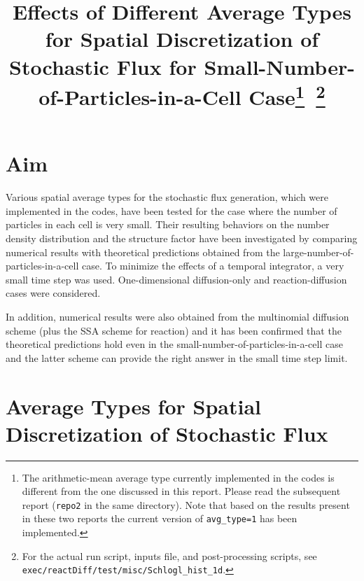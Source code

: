 \documentclass{article}
\begin{document}
\title{Effects of Different Average Types for Spatial Discretization of Stochastic Flux for Small-Number-of-Particles-in-a-Cell Case\footnote{The arithmetic-mean average type currently implemented in the codes is different from the one discussed in this report. Please read the subsequent report (\texttt{repo2} in the same directory). Note that based on the results present in these two reports the current version of \texttt{avg\_type=1} has been implemented.}~\footnote{For the actual run script, inputs file, and post-processing scripts, see \texttt{exec/reactDiff/test/misc/Schlogl\_hist\_1d}.}}

\date{}

\maketitle

\section{Aim}

Various spatial average types for the stochastic flux generation, which were implemented in the codes, have been tested for the case where the number of particles in each cell is very small.
Their resulting behaviors on the number density distribution and the structure factor have been investigated by comparing numerical results with theoretical predictions obtained from the large-number-of-particles-in-a-cell case.
To minimize the effects of a temporal integrator, a very small time step was used.
One-dimensional diffusion-only and reaction-diffusion cases were considered. 

In addition, numerical results were also obtained from the multinomial diffusion scheme (plus the SSA scheme for reaction) and it has been confirmed that the theoretical predictions hold even in the small-number-of-particles-in-a-cell case and the latter scheme can provide the right answer in the small time step limit.

\section{Average Types for Spatial Discretization of Stochastic Flux}
\end{document}
